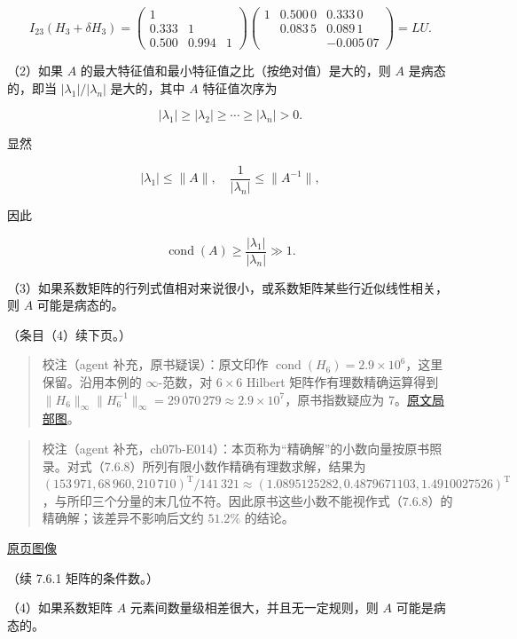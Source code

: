 \documentclass[
  10pt,
  fontset=fandol]{ctexart}
\begin{document}
\[
I_{23}(H_3+\delta H_3)
=\begin{pmatrix}
1&&\\
0.333&1&\\
0.500&0.994&1
\end{pmatrix}
\begin{pmatrix}
1&0.500\,0&0.333\,0\\
&0.083\,5&0.089\,1\\
&&\boxed{-0.005\,07}
\end{pmatrix}
=LU.
\]

（2）如果 \(A\) 的最大特征值和最小特征值之比（按绝对值）是大的，则 \(A\) 是病态的，即当 \(|\lambda_1|/|\lambda_n|\) 是大的，其中 \(A\) 特征值次序为

\[
|\lambda_1|\geqslant|\lambda_2|\geqslant\cdots\geqslant|\lambda_n|>0.
\]

显然

\[
|\lambda_1|\leqslant\|A\|,\quad\frac1{|\lambda_n|}\leqslant\|A^{-1}\|,
\]

因此

\[
\operatorname{cond}(A)\geqslant\frac{|\lambda_1|}{|\lambda_n|}\gg1.
\]

（3）如果系数矩阵的行列式值相对来说很小，或系数矩阵某些行近似线性相关，则 \(A\) 可能是病态的。

（条目（4）续下页。）

\begin{quote}
校注（agent 补充，原书疑误）：原文印作 \(\operatorname{cond}(H_6)=2.9\times10^6\)，这里保留。沿用本例的 \(\infty\)-范数，对 \(6\times6\) Hilbert 矩阵作有理数精确运算得到 \(\|H_6\|_\infty\|H_6^{-1}\|_\infty=29\,070\,279\approx2.9\times10^7\)，原书指数疑应为 7。\href{../assets/ch07b/208-h6-cond.png}{原文局部图}。
\end{quote}

\begin{quote}
校注（agent 补充，ch07b-E014）：本页称为``精确解''的小数向量按原书照录。对式（7.6.8）所列有限小数作精确有理数求解，结果为 \((153\,971,\allowbreak 68\,960,\allowbreak 210\,710)^{\mathrm T}/141\,321\approx(1.0895125282,\allowbreak 0.4879671103,\allowbreak 1.4910027526)^{\mathrm T}\)，与所印三个分量的末几位不符。因此原书这些小数不能视作式（7.6.8）的精确解；该差异不影响后文约 \(51.2\%\) 的结论。
\end{quote}

\href{../../source-images/pdf-209.jpeg}{原页图像}

（续 7.6.1 矩阵的条件数。）

（4）如果系数矩阵 \(A\) 元素间数量级相差很大，并且无一定规则，则 \(A\) 可能是病态的。
\end{document}
